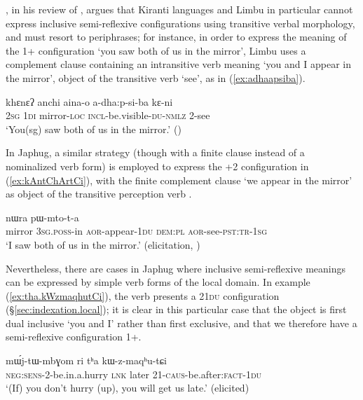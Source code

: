 \citet{driem90hayu}, in his review of \citet{michailovsky88}, argues that Kiranti languages and Limbu in particular cannot express inclusive semi-reflexive configurations using transitive verbal morphology, and must resort to periphrases; for instance, in order to express the meaning of the \fl{}1+ configuration `you saw both of us in the mirror', Limbu uses a complement clause containing an intransitive verb meaning `you and I appear in the mirror', object of the transitive verb `see', as in (\ref{ex:adhaapsiba}).

\begin{exe}
\ex   \label{ex:adhaapsiba}
\gll  khɛnɛʔ  anchi aina-o a-dha:p-si-ba kɛ-ni \\
\textsc{2sg} \textsc{1di} mirror-\textsc{loc} \textsc{incl}-be.visible-\textsc{du}-\textsc{nmlz} 2-see \\
\glt `You(sg) saw both of us in the mirror.’ (\citealt[277]{driem90hayu})
\end{exe}

In Japhug, a similar strategy (though with a finite clause instead of a nominalized verb form) is employed to express the \fl{}+2 configuration in (\ref{ex:kAntChArtCi}), with the finite complement clause  `we appear in the mirror' as object of the transitive perception verb .

\begin{exe}
\ex   \label{ex:kAntChArtCi}
 nɯra pɯ-mto-t-a \\
mirror \textsc{3sg}.\textsc{poss}-in \textsc{aor}-appear-\textsc{1du} \textsc{dem}:\textsc{pl} \textsc{aor}-see-\textsc{pst}:\textsc{tr}-\textsc{1sg} \\
\glt `I saw both of us in the mirror.' (elicitation, \citealt[85]{jacques12agreement})
\end{exe}

Nevertheless, there are cases in Japhug where inclusive semi-reflexive meanings can be expressed by simple verb forms of the local domain. In example (\ref{ex:tha.kWzmaqhutCi}), the verb  presents a 2\fl{}\textsc{1du} configuration (§\ref{sec:indexation.local}); it is clear in this particular case that the object is first dual inclusive `you and I' rather than first exclusive, and that we therefore have a semi-reflexive configuration \fl{}1+.

\begin{exe}
\ex   \label{ex:tha.kWzmaqhutCi}
\gll   mɯ́j-tɯ-mbɣom ri tʰa kɯ-z-maqʰu-tɕi \\
\textsc{neg}:\textsc{sens}-2-be.in.a.hurry \textsc{lnk} later 2\fl{}1-\textsc{caus}-be.after:\textsc{fact}-\textsc{1du} \\
\glt `(If) you don't hurry (up), you will get us late.' (elicited)
\end{exe}

